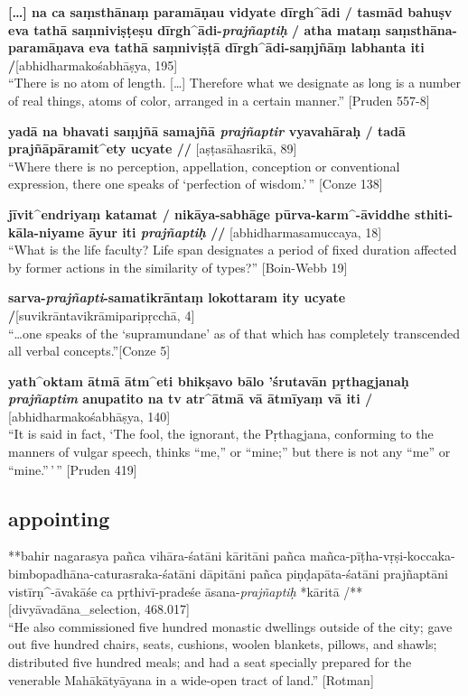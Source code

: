 \documentclass[
  letterpaper,
  DIV=11,
  numbers=noendperiod,
  oneside]{scrreprt}
\begin{document}
\textbf{{[}\ldots{]} na ca saṃsthānaṃ paramāṇau vidyate dīrgh\^{}ādi /
tasmād bahuṣv eva tathā saṃniviṣṭeṣu dīrgh\^{}ādi-\emph{prajñaptiḥ} /
atha mataṃ saṃsthāna-paramāṇava eva tathā saṃniviṣṭā
dīrgh\^{}ādi-saṃjñāṃ labhanta iti /}{[}abhidharmakośabhāṣya, 195{]}\\
``There is no atom of length. {[}\ldots{]} Therefore what we designate
as long is a number of real things, atoms of color, arranged in a
certain manner.'' {[}Pruden 557-8{]}

\textbf{yadā na bhavati saṃjñā samajñā \emph{prajñaptir} vyavahāraḥ /
tadā prajñāpāramit\^{}ety ucyate //} {[}aṣṭasāhasrikā, 89{]}\\
``Where there is no perception, appellation, conception or conventional
expression, there one speaks of `perfection of wisdom.'\,'' {[}Conze
138{]}

\textbf{jīvit\^{}endriyaṃ katamat / nikāya-sabhāge
pūrva-karm\^{}-āviddhe sthiti-kāla-niyame āyur iti \emph{prajñaptiḥ} //}
{[}abhidharmasamuccaya, 18{]}\\
``What is the life faculty? Life span designates a period of fixed
duration affected by former actions in the similarity of types?''
{[}Boin-Webb 19{]}

\textbf{sarva-\emph{prajñapti}-samatikrāntaṃ lokottaram ity ucyate
/}{[}suvikrāntavikrāmiparipṛcchā, 4{]}\\
``\ldots one speaks of the `supramundane' as of that which has
completely transcended all verbal concepts.''{[}Conze 5{]}

\textbf{yath\^{}oktam ātmā ātm\^{}eti bhikṣavo bālo 'śrutavān
pṛthagjanaḥ \emph{prajñaptim} anupatito na tv atr\^{}ātmā vā ātmīyaṃ vā
iti /} {[}abhidharmakośabhāṣya, 140{]}\\
``It is said in fact, `The fool, the ignorant, the Pṛthagjana,
conforming to the manners of vulgar speech, thinks ``me,'' or ``mine;''
but there is not any ``me'' or ``mine.''\,'\,'' {[}Pruden 419{]}

\hypertarget{appointing}{%
\subsection{appointing}\label{appointing}}

**bahir nagarasya pañca vihāra-śatāni kāritāni pañca
mañca-pīṭha-vṛṣi-koccaka-bimbopadhāna-caturasraka-śatāni dāpitāni pañca
piṇḍapāta-śatāni prajñaptāni vistīrṇ\^{}-āvakāśe ca pṛthivī-pradeśe
āsana-\emph{prajñaptiḥ} *kāritā /**{[}divyāvadāna\_selection,
468.017{]}\\
``He also commissioned five hundred monastic dwellings outside of the
city; gave out five hundred chairs, seats, cushions, woolen blankets,
pillows, and shawls; distributed five hundred meals; and had a seat
specially prepared for the venerable Mahākātyāyana in a wide-open tract
of land.'' {[}Rotman{]}
\end{document}
